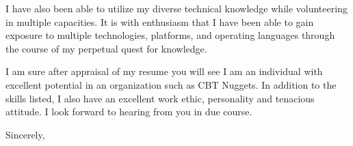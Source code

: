 \documentclass[11pt]{letter} %
\begin{document}
\begin{letter}{}
I have also been able to utilize my diverse technical knowledge while
volunteering in multiple capacities. It is with enthusiasm that I have been
able to gain exposure to multiple technologies, platforms, and operating
languages through the course of my perpetual quest for knowledge.

I am sure after appraisal of my resume you will see I am an individual with
excellent potential in an organization such as {CBT Nuggets}. In addition to
the skills listed, I also have an excellent work ethic, personality and
tenacious attitude. I look forward to hearing from you in due course.

\closing{Sincerely,}



\end{letter}
\end{document}
